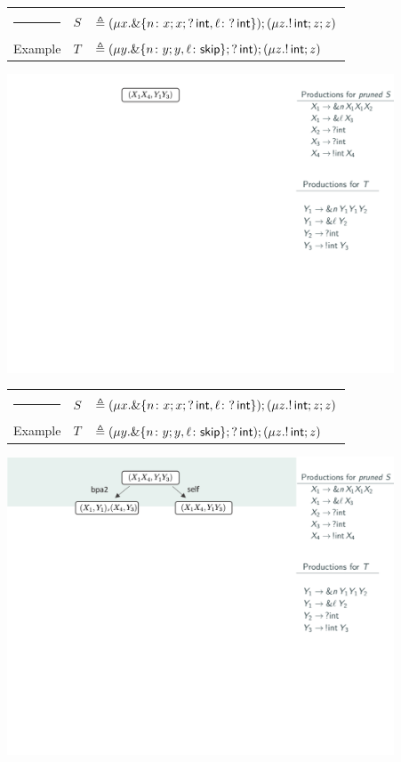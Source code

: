 \message{ !name(main.tex)}\documentclass[10pt]{beamer}
\begin{document}
\begin{frame}
	\begin{tabular} {l l l }
		{\color{teal}\rule{3cm}{2pt}} &  $S$ &$\triangleq (\mu x. \&\{n\colon x;x;?\,\mathsf{int},
     	 \ell\colon ?\,\mathsf{int} \});( \mu z. !\,\mathsf{int}; z;z )$\\
 		{\color{teal} Example}  &  $T$ &$\triangleq (\mu y. \&\{n\colon y;y,
     	 \ell\colon \mathsf{skip} \}; ?\,\mathsf{int}); (\mu z. !\,\mathsf{int}; z)$
	\end{tabular}
	\vspace*{2mm}
	\includegraphics[width=11.5cm]{img/exemplo-9}\smallskip
\end{frame}

\begin{frame}
	\begin{tabular} {l l l }
  		{\color{teal}\rule{3cm}{2pt}} &  $S$ &$\triangleq (\mu x. \&\{n\colon x;x;?\,\mathsf{int},
      	\ell\colon ?\,\mathsf{int} \});( \mu z. !\,\mathsf{int}; z;z )$\\
  	{\color{teal} Example}  &  $T$ &$\triangleq (\mu y. \&\{n\colon y;y,
      \ell\colon \mathsf{skip} \}; ?\,\mathsf{int}); (\mu z. !\,\mathsf{int}; z)$
	\end{tabular}
	\vspace*{2mm}
	\includegraphics[width=11.5cm]{img/exemplo-8}\smallskip
\end{frame}
\end{document}
